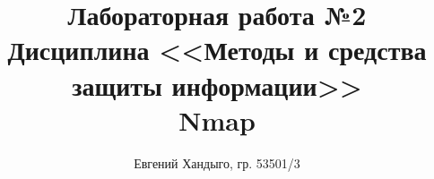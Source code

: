 \documentclass[12pt]{article}
\begin{document}
\title{
    Лабораторная работа №2 \\ 
    Дисциплина <<Методы и средства защиты информации>> \\ 
    Nmap}
\author{Евгений Хандыго, гр. 53501/3}

\maketitle
\tableofcontents

\newpage










\end{document}
